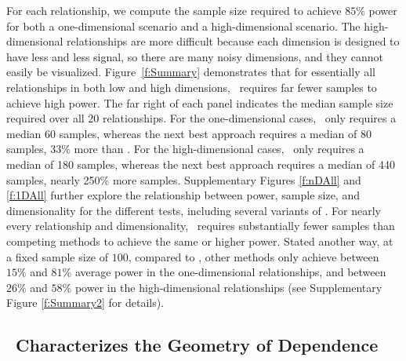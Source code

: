 \documentclass[11pt]{extarticle}
\begin{document}
For each relationship, we compute the sample size required to achieve $85\%$ power for both a one-dimensional scenario and a high-dimensional scenario. The high-dimensional relationships are more difficult because each dimension is designed to have less and less signal, 	so there are many noisy dimensions, and they cannot easily be visualized.
Figure~\ref{f:Summary} demonstrates that for essentially all relationships in both low and high dimensions, \Mgc~requires far fewer samples to achieve high power.  The far right of each panel indicates the median sample size required over all $20$ relationships.
For the one-dimensional cases, \Mgc~only requires a median 60 samples, whereas the next best approach requires a median of 80 samples, 33\% more than \Mgc.
For the high-dimensional cases, \Mgc~only requires a median of 180 samples, whereas the next best approach requires a median of 440 samples, nearly 250\% more samples.
Supplementary Figures \ref{f:nDAll} and \ref{f:1DAll} further explore the relationship between power, sample size, and dimensionality for the different tests, including several  variants of \Mgc.
For nearly every relationship {and dimensionality}, \Mgc~requires substantially fewer samples than competing methods to achieve the same or higher power.
Stated another way, at a fixed sample size of $100$, compared to \Mgc, other methods only achieve between $15\%$ and $81\%$ average power in the one-dimensional relationships, and between $26\%$ and $58\%$ power in the high-dimensional relationships (see Supplementary Figure \ref{f:Summary2} for details).

\subsection*{\Mgc~Characterizes the Geometry of Dependence}
\label{main3}
\end{document}
